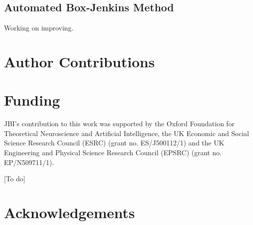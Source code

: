 \documentclass{article}
\begin{document}
\subsection{Automated Box-Jenkins Method}
\label{methods:automated_box_jenkins}

Working on improving.





\section{Author Contributions}








\section{Funding}

JBI’s contribution to this work was supported by the Oxford Foundation for Theoretical Neuroscience and Artificial Intelligence, the UK Economic and Social Science Research Council (ESRC) (grant no. ES/J500112/1) and the UK Engineering and Physical Science Research Council (EPSRC) (grant no. EP/N509711/1).

[To do]



\section{Acknowledgements}

%   
% 

\printbibliography








\end{document}
